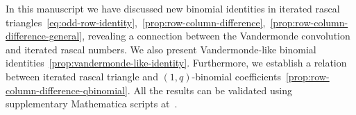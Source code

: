 In this manuscript we have discussed new binomial identities in iterated rascal
triangles~\eqref{eq:odd-row-identity},~\eqref{prop:row-column-difference},~\eqref{prop:row-column-difference-general},
revealing a connection between the Vandermonde convolution and iterated rascal numbers.
We also present Vandermonde-like binomial identities~\eqref{prop:vandermonde-like-identity}.
Furthermore, we establish a relation between iterated rascal triangle
and $(1,q)$-binomial coefficients~\eqref{prop:row-column-difference-qbinomial}.
All the results can be validated using supplementary Mathematica scripts at~\cite{kolosov2024identities}.
